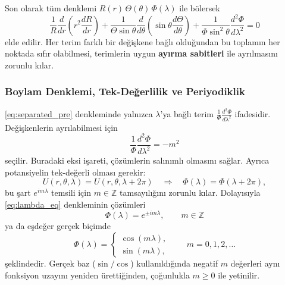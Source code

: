 \noindent
Son olarak tüm denklemi $R(r)\,\Theta(\theta)\,\Phi(\lambda)$ ile bölersek
\begin{equation}
\frac{1}{R}\frac{d}{dr}\!\left(r^2\frac{dR}{dr}\right)
+
\frac{1}{\Theta\sin\theta}\frac{d}{d\theta}\!\left(\sin\theta\frac{d\Theta}{d\theta}\right)
+
\frac{1}{\Phi\sin^2\theta}\frac{d^2\Phi}{d\lambda^2}
=0
\label{eq:separated_pre}
\end{equation}
elde edilir.
Her terim farklı bir değişkene bağlı olduğundan bu toplamın her noktada sıfır olabilmesi,
terimlerin uygun \textbf{ayırma sabitleri} ile ayrılmasını zorunlu kılar.

\subsubsection{Boylam Denklemi, Tek-Değerlilik ve Periyodiklik}
\label{subsubsec:lambda_periodicity}

\eqref{eq:separated_pre} denkleminde yalnızca $\lambda$'ya bağlı terim
$\frac{1}{\Phi}\frac{d^2\Phi}{d\lambda^2}$ ifadesidir. Değişkenlerin ayrılabilmesi için
\begin{equation}
\frac{1}{\Phi}\frac{d^2\Phi}{d\lambda^2}=-m^2
\label{eq:lambda_eq}
\end{equation}
seçilir. Buradaki eksi işareti, çözümlerin salınımlı olmasını sağlar. Ayrıca potansiyelin tek-değerli olması gerekir:
\begin{equation}
U(r,\theta,\lambda)=U(r,\theta,\lambda+2\pi)
\quad\Longrightarrow\quad
\Phi(\lambda)=\Phi(\lambda+2\pi),
\label{eq:single_valuedness}
\end{equation}
bu şart $e^{im\lambda}$ temsili için $m\in\mathbb{Z}$ tamsayılığını zorunlu kılar. Dolayısıyla
\eqref{eq:lambda_eq} denkleminin çözümleri
\begin{equation}
\Phi(\lambda)=e^{\pm i m\lambda},
\qquad m\in\mathbb{Z}
\label{eq:lambda_solution_complex}
\end{equation}
ya da eşdeğer gerçek biçimde
\begin{equation}
\Phi(\lambda)=
\begin{cases}
\cos(m\lambda),\\[2pt]
\sin(m\lambda),
\end{cases}
\qquad m=0,1,2,\dots
\label{eq:lambda_solution_real}
\end{equation}
şeklindedir. Gerçek baz ($\sin/\cos$) kullanıldığında negatif $m$ değerleri aynı fonksiyon uzayını yeniden ürettiğinden,
çoğunlukla $m\ge 0$ ile yetinilir.

